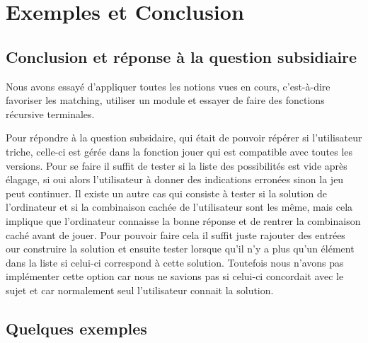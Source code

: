 \documentclass[a4paper,twoside,12pt]{report}
\begin{document}
\chapter{Exemples et Conclusion}
%
\section{Conclusion et réponse à la question subsidiaire}
\par Nous avons essayé d'appliquer toutes les notions vues en cours, c'est-à-dire favoriser les matching, utiliser un module et essayer de faire des fonctions récursive terminales.
\par Pour répondre à la question subsidaire, qui était de pouvoir répérer si l'utilisateur triche, celle-ci est gérée dans la fonction jouer qui est compatible avec toutes les versions. Pour se faire il suffit de tester si la liste des possibilités est vide après élagage, si oui alors l'utilisateur à donner des indications erronées sinon la jeu peut continuer. Il existe un autre cas qui consiste à tester si la solution de l'ordinateur et si la combinaison cachée de l'utilisateur sont les même, mais cela implique que l'ordinateur connaisse la bonne réponse et de rentrer la combinaison caché avant de jouer. Pour pouvoir faire cela il suffit juste rajouter des entrées our construire la solution et ensuite tester lorsque qu'il n'y a plus qu'un élément dans la liste si celui-ci correspond à cette solution. Toutefois nous n'avons pas implémenter cette option car nous ne savions pas si celui-ci concordait avec le sujet et car normalement seul l'utilisateur connait la solution.

\section{Quelques exemples}
\end{document}
